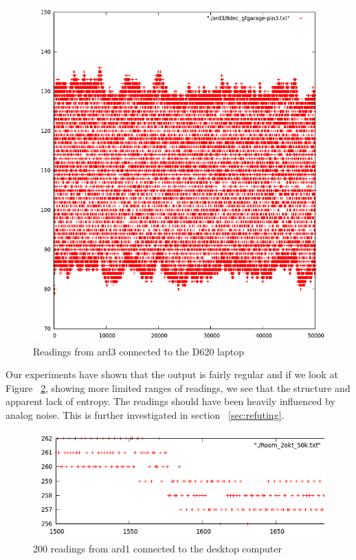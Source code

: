 \documentclass[a4paper]{article}           %
\begin{document}
\begin{figure}[h!]
  \centering
  \includegraphics[width=0.7\columnwidth]{img/ard3gfgarage.png}
  \caption{Readings from ard3 connected to the D620 laptop}
  \label{fig:gfgarageard3}
\end{figure}


Our experiments have shown that the output is fairly regular and if we look at Figure ~\ref{fig:ardzoom}, showing more limited ranges of readings, we see that the structure and apparent lack of entropy. The readings should have been heavily influenced by analog noise\cite{ardref}. This is further investigated in section ~\ref{sec:refuting}. 

\begin{figure}[h!]


  \centering
  \includegraphics[width=0.7\columnwidth]{img/Room_1500-1700_zoom.png}
  \caption{200 readings from ard1 connected to the desktop computer}
  \label{fig:ardzoom}

\end{figure}
\end{document}
